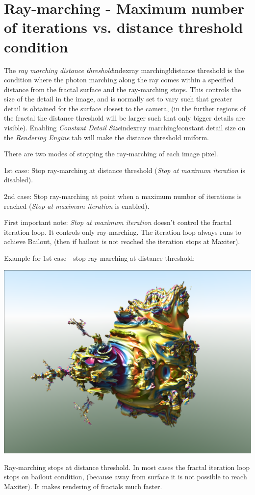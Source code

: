 \section{Ray-marching - Maximum number of iterations vs. distance threshold
	condition}\label{ray-marching---maximum-number-of-iterations-vs.-distance-threshold-condition}

The \emph{ray marching distance threshold}index{ray marching!distance threshold} is the condition where the photon
marching along the ray comes within a specified distance from the fractal
surface and the ray-marching stops. This controls the size of the detail in the
image, and is normally set to vary such that greater detail is obtained for the
surface closest to the camera, (in the further regions of the fractal the
distance threshold will be larger such that only bigger details are visible).
Enabling \emph{Constant Detail Size}index{ray marching!constant detail size} on the \emph{Rendering Engine} tab will
make the distance threshold uniform.

There are two modes of stopping the ray-marching of each image pixel.

1st case: Stop ray-marching at distance threshold (\emph{Stop at maximum
	iteration} is disabled).

2nd case: Stop ray-marching at point when a maximum number of iterations is
reached (\emph{Stop at maximum iteration} is enabled).

First important note: \emph{Stop at maximum iteration} doesn't control the
fractal iteration loop. It controls only ray-marching. The iteration loop always
runs to achieve Bailout, (then if bailout is not reached the iteration stops at
Maxiter).

Example for 1st case - stop ray-marching at distance threshold: \nopagebreak

\includegraphics[width=0.5\linewidth]{img/manual/media/stop_raymarching_at_disttrhersh}

Ray-marching stops at distance threshold. In most cases the fractal iteration
loop stops on bailout condition, (because away from surface it is not possible
to reach Maxiter). It makes rendering of fractals much faster.

